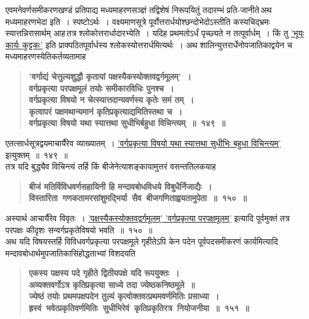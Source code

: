 \documentclass[11pt, openany]{book}
\begin{document}
\begin{sloppypar}
{\small एवमनेवर्णसमीकरणखण्डं प्रतिपाद्य मध्यमाहरणसञ्ज्ञं तद्विशेषं निरूपयितुं तदारम्भं प्रति-जानीते\textendash \,अथ मध्यमाहरणभेदा इति~। स्पष्टोऽर्थः~। वक्ष्यमाणसूत्रे पूर्वोत्तरार्धयोश्छन्दोभेदोऽस्तीति कस्यचिद्भ्रमः स्यात्तन्निरासार्थम् आह\textendash \,तत्र श्लोकोत्तरार्धादारभ्येति~। यदिह प्रथमतोऽर्धं पृच्छ्यते न तत्पूर्वार्धम्~। किं तु \hyperref[9.134]{'भूयः कार्यः कुट्टकः'} इति प्राक्पठितपूर्वार्धस्य श्लोकस्योत्तरार्धमित्यर्थः~। अथ शालिन्युत्तरार्धेनोपजातिकाद्वयेन च मध्यमाहरणस्येतिकर्तव्यतामाह\textendash }

 \label{10.149}
\begin{quote}
{\large \textbf{{\color{purple}'वर्गाद्यं चेत्तुल्यशुद्धौ कृतायां पक्षस्यैकस्योक्तवद्वर्गमूलम्'~।\\
वर्गप्रकृत्या परपक्षमूलं तयोः समीकारविधिः पुनश्च~।\\
वर्गप्रकृत्या विषयो न चेत्स्यात्तदान्यवर्णस्य कृतेः समं तम्~।\\
कृत्वापरं पक्षमथान्यमानं कृतिप्रकृत्याद्यमितिस्तथा च~।\\
वर्गप्रकृत्या विषयो यथा स्यात्तथा सुधीभिर्बहुधा विचिन्त्यम्~॥~१४९~॥}}}
\end{quote}

एतत्सार्धसूत्रद्वयमाचार्यैरेव व्याख्यातम्~। \hyperref[10.149]{'वर्गप्रकृत्या विषयो यथा स्यात्तथा सुधीभिः बहुधा विचिन्त्यम्'} इत्युक्तम्~॥~१४९~॥\\

{\small तत्र यदि बुद्ध्यैव विचिन्त्यं तर्हि किं बीजेनेत्याशङ्कायामुत्तरं वसन्ततिलकयाह\textendash }

 \label{10.150}
\begin{quote}
{\large \textbf{{\color{purple}बीजं मतिर्विविधवर्णसहायिनी हि मन्दावबोधविधये विबुधैर्निजाद्यैः~।\\
विस्तारिता~गणकतामरसांशुमद्भिर्या~सैव~बीजगणिताह्वयतामुपेता~॥~१५०~॥}}}
\end{quote}

अस्यार्थ आचार्यैरेव विवृतः~। \hyperref[10.149]{'पक्षस्यैकस्योक्तवद्वर्गमूलम्' 'वर्गप्रकृत्या परपक्षमूलम्'} इत्यादि पूर्वमुक्तं तत्र परपक्षः कीदृशः सन्वर्गप्रकृतेविषयो भवति~॥~१५०~॥\\

{\small अथ यदि विषयस्तर्हि विविधवर्गप्रकृत्या परपक्षमूले गृहीतेऽपि केन पदेन पूर्वपदसमीकरणं कार्यमित्यादि मन्दावबोधार्थमुपजातिकासिंहोद्धताभ्यां विशदयति\textendash }

 \label{10.151}
\begin{quote}
{\large \textbf{{\color{purple}एकस्य पक्षस्य पदे गृहीते द्वितीयपक्षे यदि रूपयुक्तः~।\\
अव्यक्तवर्गोऽत्र कृतिप्रकृत्या साध्ये तदा ज्येष्ठकनिष्ठमूले~॥\\
ज्येष्ठं तयोः प्रथमपक्षपदेन तुल्यं कृत्वोक्तवत्प्रथमवर्णमितिः प्रसाध्या~।\\
ह्रस्वं~भवेत्प्रकृतिवर्णमितिः~सुधीभिरेवं~कृतिप्रकृतिरत्र~नियोजनीया~॥~१५१~॥}}}
\end{quote}
\end{sloppypar}
\end{document}
